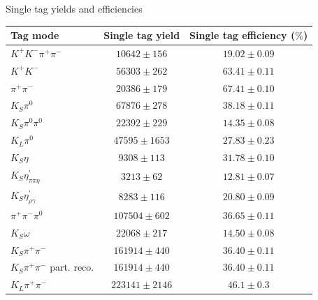 \documentclass{beamer}
\begin{document}
\begin{frame}{Single tag yields and efficiencies}
  \begin{center}
    \begin{tabular}{lcc}
      Tag mode                          & Single tag yield     & Single tag efficiency ($\%$) \\
      \hline
      $K^+K^-\pi^+\pi^-$                & $10642 \pm 156$      & $19.02 \pm 0.09$     \\
      \hline
      $K^+K^-$                          & $56303 \pm 262$      & $63.41 \pm 0.11$     \\
      $\pi^+\pi^-$                      & $20386 \pm 179$      & $67.41 \pm 0.10$     \\
      $K_S\pi^0$                        & $67876 \pm 278$      & $38.18 \pm 0.11$     \\
      $K_S\pi^0\pi^0$                   & $22392 \pm 229$      & $14.35 \pm 0.08$     \\
      $K_L\pi^0$                        & $47595 \pm 1653$     & $27.83 \pm 0.23$     \\
      \hline
      $K_S\eta$                         & $9308 \pm 113$       & $31.78 \pm 0.10$     \\
      $K_S\eta^\prime_{\pi\pi\eta}$     & $3213 \pm 62$        & $12.81 \pm 0.07$     \\
      $K_S\eta^\prime_{\rho\gamma}$     & $8283 \pm 116$       & $20.80 \pm 0.09$     \\
      $\pi^+\pi^-\pi^0$                 & $107504 \pm 602$     & $36.65 \pm 0.11$     \\
      $K_S\omega$                       & $22068 \pm 217$      & $14.50 \pm 0.08$     \\
      \hline
      $K_S\pi^+\pi^-$                   & $161914 \pm 440$     & $36.40 \pm 0.11$     \\
      $K_S\pi^+\pi^-$ part. reco.       & $161914 \pm 440$     & $36.40 \pm 0.11$     \\
      $K_L\pi^+\pi^-$                   & $223141 \pm 2146$    & $46.1 \pm 0.3$       \\
      \hline
    \end{tabular}
  \end{center}
\end{frame}
\end{document}
